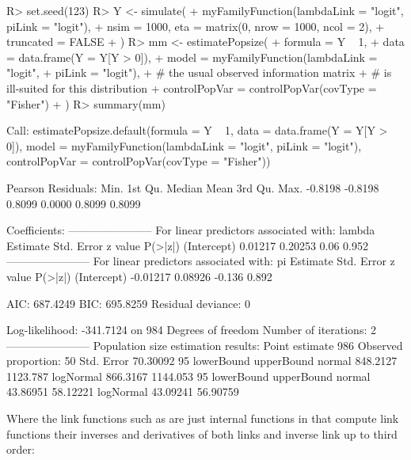 \documentclass[
]{jss}
\newcommand{\1}{\mathcal{I}} \newcommand{\bZero}{\boldsymbol{0}}
\begin{document}
\begin{CodeChunk}
\begin{CodeInput}
R> set.seed(123)
R> Y <- simulate(
+     myFamilyFunction(lambdaLink = "logit", piLink = "logit"),
+     nsim = 1000, eta = matrix(0, nrow = 1000, ncol = 2),
+     truncated = FALSE
+ )
R> mm <- estimatePopsize(
+     formula = Y ~ 1,
+     data = data.frame(Y = Y[Y > 0]),
+     model = myFamilyFunction(lambdaLink = "logit", 
+                              piLink = "logit"),
+     # the usual observed information matrix 
+     # is ill-suited for this distribution
+     controlPopVar = controlPopVar(covType = "Fisher")
+ )
R> summary(mm)
\end{CodeInput}
\begin{CodeOutput}

Call:
estimatePopsize.default(formula = Y ~ 1, data = data.frame(Y = Y[Y > 
    0]), model = myFamilyFunction(lambdaLink = "logit", piLink = "logit"), 
    controlPopVar = controlPopVar(covType = "Fisher"))

Pearson Residuals:
   Min. 1st Qu.  Median    Mean 3rd Qu.    Max. 
-0.8198 -0.8198  0.8099  0.0000  0.8099  0.8099 

Coefficients:
-----------------------
For linear predictors associated with: lambda 
            Estimate Std. Error z value P(>|z|)
(Intercept)  0.01217    0.20253    0.06   0.952
-----------------------
For linear predictors associated with: pi 
            Estimate Std. Error z value P(>|z|)
(Intercept) -0.01217    0.08926  -0.136   0.892

AIC: 687.4249
BIC: 695.8259
Residual deviance: 0

Log-likelihood: -341.7124 on 984 Degrees of freedom 
Number of iterations: 2
-----------------------
Population size estimation results: 
Point estimate 986
Observed proportion: 50%
Std. Error 70.30092
95%
          lowerBound upperBound
normal      848.2127   1123.787
logNormal   866.3167   1144.053
95%
          lowerBound upperBound
normal      43.86951   58.12221
logNormal   43.09241   56.90759
\end{CodeOutput}
\end{CodeChunk}

Where the link functions such as
 are just internal
functions in  that compute link functions their
inverses and derivatives of both links and inverse link up to third
order: \small
\end{document}
